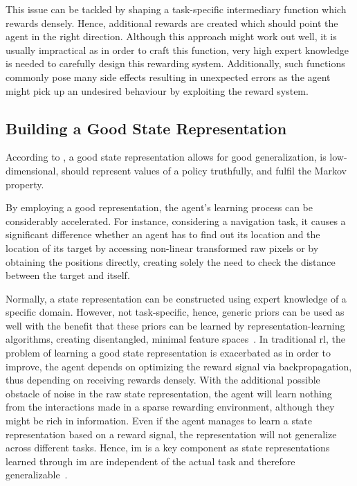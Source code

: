\documentclass[draft,final]{vutinfth} %
\begin{document}
    This issue can be tackled by shaping a task-specific intermediary function which rewards densely.
    Hence, additional rewards are created which should point the agent in the right direction.
    Although this approach might work out well, it is usually impractical as in order to craft this function, very high expert knowledge is needed to carefully design this rewarding system.
    Additionally, such functions commonly pose many side effects resulting in unexpected errors as the agent might pick up an undesired behaviour by exploiting the reward system.

    \subsection{Building a Good State Representation}\label{subsec:building-a-good-state-representation}

    According to \citeauthor{bohmer_autonomous_2015}, a good state representation allows for good generalization, is low-dimensional, should represent values of a policy truthfully, and fulfil the Markov property.

    By employing a good representation, the agent's learning process can be considerably accelerated.
    For instance, considering a navigation task, it causes a significant difference whether an agent has to find out its location and the location of its target by accessing non-linear transformed raw pixels or by obtaining the positions directly, creating solely the need to check the distance between the target and itself.

    Normally, a state representation can be constructed using expert knowledge of a specific domain.
    However, not task-specific, hence, generic priors can be used as well with the benefit that these priors can be learned by representation-learning algorithms, creating disentangled, minimal feature spaces~\citep{bengio_representation_2014}.
    In traditional \gls{rl}, the problem of learning a good state representation is exacerbated as in order to improve, the agent depends on optimizing the reward signal via backpropagation, thus depending on receiving rewards densely.
    With the additional possible obstacle of noise in the raw state representation, the agent will learn nothing from the interactions made in a sparse rewarding environment, although they might be rich in information.
    Even if the agent manages to learn a state representation based on a reward signal, the representation will not generalize across different tasks.
    Hence, \gls{im} is a key component as state representations learned through \gls{im} are independent of the actual task and therefore generalizable~\citep{aubret_survey_2019}.
\end{document}
